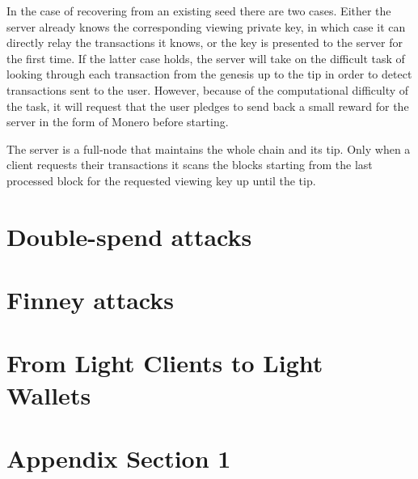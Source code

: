 \documentclass[sigconf]{acmart}
\begin{document}
In the case of recovering from an existing seed there are two cases. Either the server already knows the corresponding viewing private key, in which case it can directly relay the transactions it knows, or the key is presented to the server for the first time. If the latter case holds, the server will take on the difficult task of looking through each transaction from the genesis up to the tip in order to detect transactions sent to the user. However, because of the computational difficulty of the task, it will request that the user pledges to send back a small reward for the server in the form of Monero before starting.

The server is a full-node that maintains the whole chain and its tip. Only when a client requests their transactions it scans the blocks starting from the last processed block for the requested viewing key up until the tip.

\section{Double-spend attacks}
\section{Finney attacks}

\section{From Light Clients to Light Wallets}

\begin{acks}
\end{acks}




\appendix

\section{Appendix Section 1}
\end{document}

